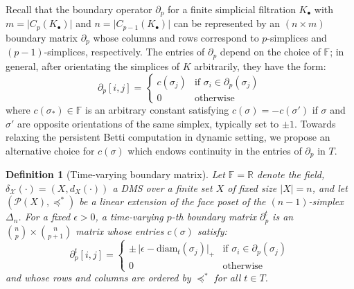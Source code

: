 \documentclass[10pt]{article}
\newtheorem{definition}{Definition}
\begin{document}
Recall that the boundary operator $\partial_p$ for a finite simplicial filtration $K_{\bullet}$ with $m = \lvert C_p(K_{\bullet}) \rvert$ and $n = \lvert C_{p-1}(K_{\bullet}) \rvert$ can be represented by an $(n \times m)$ boundary matrix $\partial_p$ whose columns and rows correspond to $p$-simplices and $(p-1)$-simplices, respectively. The entries of $\partial_p$ depend on the choice of $\mathbb{F}$; in general, after orientating the simplices of $K$ arbitrarily, they have the form: 
\begin{equation}\label{eq:matrix_pchain}
	\partial_p[i, j] = \begin{cases} 
	c(\sigma_j)  & \text{if } \sigma_i \in \partial_p(\sigma_j) \\
	0 & \text{otherwise}
   \end{cases}
\end{equation}
where $c(\sigma_\ast) \in \mathbb{F}$ is an arbitrary constant satisfying $c(\sigma) = -c(\sigma')$ if $\sigma$ and $\sigma'$ are opposite orientations of the same simplex, typically set to $\pm 1$.  Towards relaxing the persistent Betti computation in dynamic setting, we propose an alternative choice for $c(\sigma)$ which endows continuity in the entries of $\partial_p$ in $T$.
\begin{definition}[Time-varying boundary matrix]\label{def:time_boundary_matrix}
Let $\mathbb{F} = \mathbb{R}$ denote the field, $\delta_{\mathcal{X}}(\cdot) = (X, d_X(\cdot))$ a DMS over a finite set $X$ of fixed size $\lvert X \rvert = n$, and let $(\mathcal{P}(X), \preceq^\ast)$ be a linear extension of the face poset of the $(n-1)$-simplex $\Delta_n$. 
For a fixed $\epsilon > 0$, a time-varying $p$-th boundary matrix $\partial_p^t$ is an $\binom{n}{p} \times \binom{n}{p+1}$ matrix whose entries $c(\sigma)$ satisfy:
$$
\partial_p^t[i,j] = \begin{cases}
	\pm \, \lvert \epsilon - \mathrm{diam}_t(\sigma_j) \rvert_{+} & \text{if } \sigma_i \in \partial_p(\sigma_j)\\
	0 & \text{otherwise}
\end{cases} 
$$
and whose rows and columns are ordered by $\preceq^\ast$ for all $t \in T$.%
\end{definition}
\end{document}

